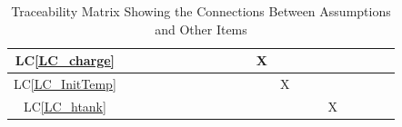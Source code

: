 \documentclass[12pt]{article}
\newcommand{\lcref}[1]{LC\ref{#1}}
\begin{document}
{\begin{landscape}
\begin{table}[h!]
\begin{tabular}{|c|c|c|c|c|c|c|c|c|c|c|c|c|c|c|c|c|c|c|c|}
                \lcref{LC_charge}   &                            &                 &                &               &                        &                  &                    &                &                 &                   & X               &                   &                     &                  &                &                   &               &                    &                   \\ \hline
                \lcref{LC_InitTemp} &                            &                 &                &               &                        &                  &                    &                &                 &                   &                 & X                 &                     &                  &                &                   &               &                    &                   \\ \hline
                \lcref{LC_htank}    &                            &                 &                &               &                        &                  &                    &                &                 &                   &                 &                   &                     &                  & X              &                   &               &                    &                   \\
                \hline
            \end{tabular}
            \caption{Traceability Matrix Showing the Connections Between Assumptions and Other Items}
            \label{Table:A_trace}
        \end{table}
    \end{landscape}
}
\end{document}
